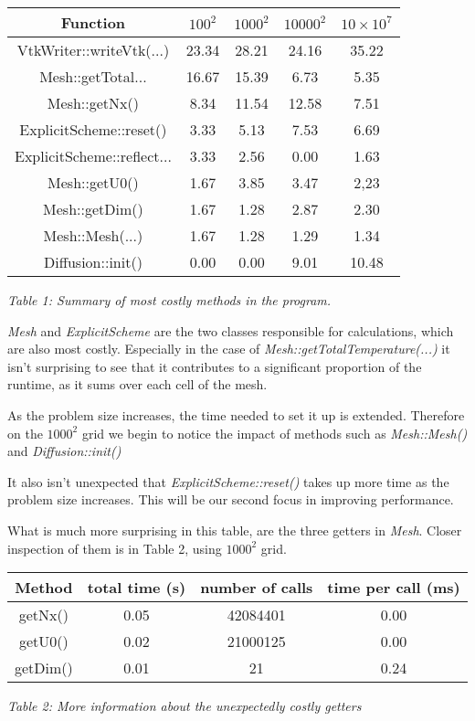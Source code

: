\documentclass[11pt,journal]{IEEEtran}
\begin{document}
	\begin{table}[h]
		\centering
		\begin{tabular}{|c|c|c|c|c|}
			\hline
			Function & $100^2$ & $1000^2$ & $10000^2$ & $10\times 10^7$\\
			\hline
			VtkWriter::writeVtk(...) & 23.34  & 28.21 & 24.16 & 35.22\\
			\hline
			Mesh::getTotal... & 16.67 & 15.39 & 6.73 & 5.35\\
			\hline
			Mesh::getNx() & 8.34 & 11.54 & 12.58 & 7.51\\
			\hline
			ExplicitScheme::reset() & 3.33 & 5.13 & 7.53 & 6.69\\
			\hline
			ExplicitScheme::reflect... & 3.33 & 2.56 & 0.00 &1.63\\
			\hline
			Mesh::getU0() & 1.67 & 3.85 & 3.47 & 2,23\\
			\hline
			Mesh::getDim() & 1.67 & 1.28 & 2.87 & 2.30\\
			\hline 
			Mesh::Mesh(...) & 1.67 & 1.28 & 1.29 & 1.34\\
			\hline
			Diffusion::init() & 0.00 & 0.00 & 9.01 & 10.48\\
			\hline
		\end{tabular}
	
	\emph{Table 1: Summary of most costly methods in the program.}
	\end{table}

	\emph{Mesh} and \emph{ExplicitScheme} are the two classes responsible for calculations, which are also most costly. Especially in the case of \emph{Mesh::getTotalTemperature(...)} it isn't surprising to see that it contributes to a significant proportion of the runtime, as it sums over each cell of the mesh.
	
	As the problem size increases, the time needed to set it up is extended. Therefore on the $1000^2$ grid we begin to notice the impact of methods such as \emph{Mesh::Mesh()} and \emph{Diffusion::init()}
	
	It also isn't unexpected that \emph{ExplicitScheme::reset()} takes up more time as the problem size increases. This will be our second focus in improving performance.
	
	What is much more surprising in this table, are the three getters in \emph{Mesh}. Closer inspection of them is in Table 2, using $1000^2$ grid.
	\begin{table}[h]
		\centering
		\begin{tabular}{|c|c|c|c|}
			\hline
			Method & total time (s) & number of calls & time per call (ms) \\
			\hline
			getNx() & 0.05 & 42084401 & 0.00 \\
			\hline
			getU0() & 0.02 &21000125 & 0.00 \\
			\hline
			getDim() &0.01 &21& 0.24\\
			\hline
		\end{tabular}
	
	\emph{Table 2: More information about the unexpectedly costly getters}
	\end{table}
\end{document}
